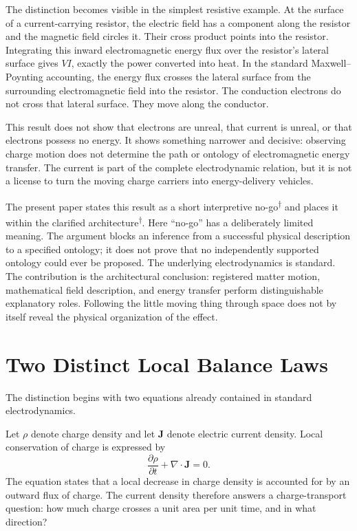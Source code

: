 \documentclass[12pt,onecolumn]{article}
\newcommand{\defterm}[2]{#1\textsuperscript{\textcolor{gray}{\hyperref[#2]{\scriptsize$\dagger$}}}}
\newcounter{nogo}[section]
\begin{document}
The distinction becomes visible in the simplest resistive example. At the surface of a current-carrying resistor, the electric field has a component along the resistor and the magnetic field circles it. Their cross product points into the resistor. Integrating this inward electromagnetic energy flux over the resistor's lateral surface gives $VI$, exactly the power converted into heat. In the standard Maxwell--Poynting accounting, the energy flux crosses the lateral surface from the surrounding electromagnetic field into the resistor. The conduction electrons do not cross that lateral surface. They move along the conductor.

This result does not show that electrons are unreal, that current is unreal, or that electrons possess no energy. It shows something narrower and decisive: observing charge motion does not determine the path or ontology of electromagnetic energy transfer. The current is part of the complete electrodynamic relation, but it is not a license to turn the moving charge carriers into energy-delivery vehicles.

The present paper states this result as a short \defterm{interpretive no-go}{def:interpretivenogo} and places it within the \defterm{clarified architecture}{def:clarifiedarchitecture}. Here ``no-go'' has a deliberately limited meaning. The argument blocks an inference from a successful physical description to a specified ontology; it does not prove that no independently supported ontology could ever be proposed. The underlying electrodynamics is standard. The contribution is the architectural conclusion: registered matter motion, mathematical field description, and energy transfer perform distinguishable explanatory roles. Following the little moving thing through space does not by itself reveal the physical organization of the effect.


\section{Two Distinct Local Balance Laws}

The distinction begins with two equations already contained in standard electrodynamics.

Let $\rho$ denote charge density and let $\mathbf J$ denote electric current density. Local conservation of charge is expressed by
\[
\frac{\partial \rho}{\partial t}+\nabla\cdot\mathbf J=0.
\]
The equation states that a local decrease in charge density is accounted for by an outward flux of charge. The current density therefore answers a charge-transport question: how much charge crosses a unit area per unit time, and in what direction?
\end{document}
